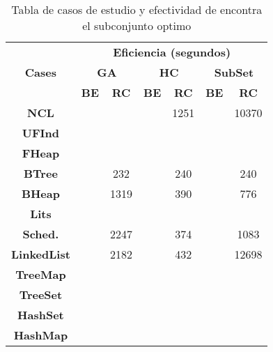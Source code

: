 \begin{table}[t]
\centering
\label{tab:t1}
\scriptsize
\begin{tabular}{|c c|cc|cc|cc|}
\midrule
\multicolumn{2}{|c|}{\multirow{3}{*}{\textbf{Cases}}} & \multicolumn{6}{c|}{\textbf{Eficiencia (segundos)}} \\
\cline{3-8}
\multicolumn{2}{|c|}{} & \multicolumn{2}{c}{\textbf{GA}} & \multicolumn{2}{c}{\textbf{HC}} & \multicolumn{2}{c|}{\textbf{SubSet}} \\
\multicolumn{2}{|c|}{} & \textbf{\tiny{BE}} & \textbf{\tiny{RC}} & \textbf{\tiny{BE}} & \textbf{\tiny{RC}} & \textbf{\tiny{BE}} & \textbf{\tiny{RC}} \\
\midrule
\multicolumn{2}{|c|}{\textbf{NCL}} &   &   &  &  1251 & & 10370 \\
\midrule
\multicolumn{2}{|c|}{\textbf{UFInd}}&   &   &   &   &   &      \\
\midrule

\multicolumn{2}{|c|}{\textbf{FHeap}} &   &   &   &   &   &     \\
\midrule

\multicolumn{2}{|c|}{\textbf{BTree}} &   &  232 &   & 240   &   & 240   \\
\midrule

\multicolumn{2}{|c|}{\textbf{BHeap}} &   &  1319 &   & 390  &   &  776   \\
\midrule

\multicolumn{2}{|c|}{\textbf{Lits}} &   &   &   &   &   &    \\
\midrule

\multicolumn{2}{|c|}{\textbf{Sched.}} &   & 2247  &   & 374  &   &1083    \\

\midrule
\multicolumn{2}{|c|}{\textbf{LinkedList}} &  &  2182 &   &  432 &  &  12698  \\
\midrule

\multicolumn{2}{|c|}{\textbf{TreeMap}} &   &   &   &   &   &     \\
\midrule

\multicolumn{2}{|c|}{\textbf{TreeSet}} &   &   &   &   &   &    \\
\midrule

\multicolumn{2}{|c|}{\textbf{HashSet}} &   &   &   &   &   &    \\
\midrule

\multicolumn{2}{|c|}{\textbf{HashMap}} &   &   &   &   &   &    \\
\hline
\end{tabular}

\caption{Tabla de casos de estudio y efectividad de encontra el subconjunto optimo}
\label{tab:efectividad}
\end{table}


